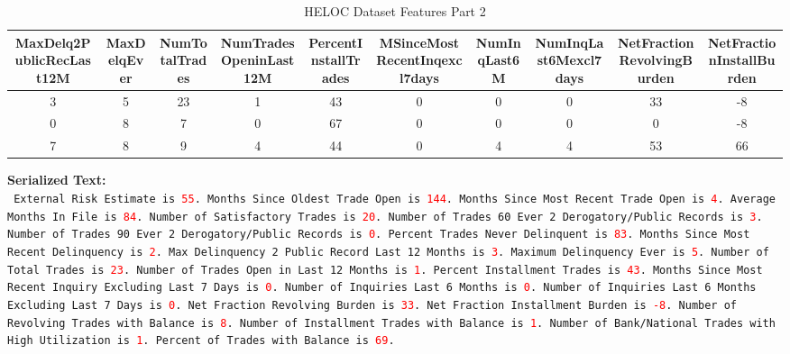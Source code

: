 \documentclass{article}
\theoremstyle{plain}
\theoremstyle{definition}
\theoremstyle{remark}
\begin{document}
\begin{table}[h!]
    \centering
    \caption{HELOC Dataset Features Part 2}
    \begin{adjustbox}{width=\textwidth}
    \begin{tabular}{cccccccccc}
    \toprule
    MaxDelq2PublicRecLast12M & MaxDelqEver & NumTotalTrades & NumTradesOpeninLast12M & PercentInstallTrades & MSinceMostRecentInqexcl7days & NumInqLast6M & NumInqLast6Mexcl7days & NetFractionRevolvingBurden & NetFractionInstallBurden \\
    \midrule
    3 & 5 & 23 & 1 & 43 & 0 & 0 & 0 & 33 & -8 \\
    0 & 8 & 7 & 0 & 67 & 0 & 0 & 0 & 0 & -8 \\
    7 & 8 & 9 & 4 & 44 & 0 & 4 & 4 & 53 & 66 \\
    \bottomrule
    \end{tabular}
    \end{adjustbox}
\end{table}
\newpage
\begin{mdframed}
\textbf{Serialized Text:}\\
\texttt{%
External Risk Estimate is \textcolor{red}{55}. 
Months Since Oldest Trade Open is \textcolor{red}{144}. 
Months Since Most Recent Trade Open is \textcolor{red}{4}. 
Average Months In File is \textcolor{red}{84}. 
Number of Satisfactory Trades is \textcolor{red}{20}. 
Number of Trades 60 Ever 2 Derogatory/Public Records is \textcolor{red}{3}. 
Number of Trades 90 Ever 2 Derogatory/Public Records is \textcolor{red}{0}. 
Percent Trades Never Delinquent is \textcolor{red}{83}. 
Months Since Most Recent Delinquency is \textcolor{red}{2}. 
Max Delinquency 2 Public Record Last 12 Months is \textcolor{red}{3}. 
Maximum Delinquency Ever is \textcolor{red}{5}. 
Number of Total Trades is \textcolor{red}{23}. 
Number of Trades Open in Last 12 Months is \textcolor{red}{1}. 
Percent Installment Trades is \textcolor{red}{43}. 
Months Since Most Recent Inquiry Excluding Last 7 Days is \textcolor{red}{0}. 
Number of Inquiries Last 6 Months is \textcolor{red}{0}. 
Number of Inquiries Last 6 Months Excluding Last 7 Days is \textcolor{red}{0}. 
Net Fraction Revolving Burden is \textcolor{red}{33}. 
Net Fraction Installment Burden is \textcolor{red}{-8}. 
Number of Revolving Trades with Balance is \textcolor{red}{8}. 
Number of Installment Trades with Balance is \textcolor{red}{1}. 
Number of Bank/National Trades with High Utilization is \textcolor{red}{1}. 
Percent of Trades with Balance is \textcolor{red}{69}.
}
\end{mdframed}
\end{document}
